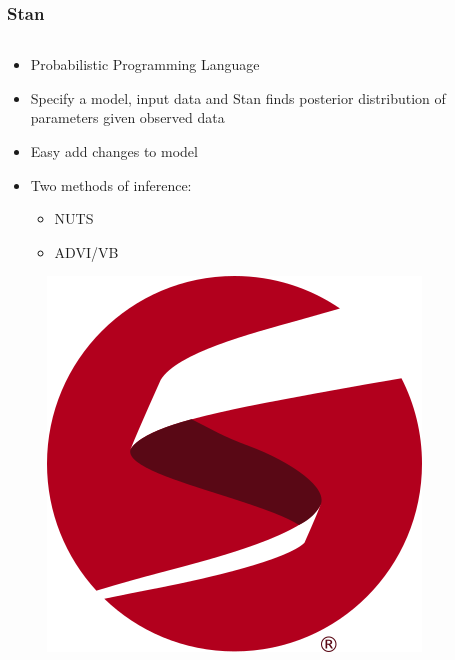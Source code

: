 \documentclass{beamer}
\begin{document}
\begin{frame}
\frametitle{Stan}
    \begin{columns}
\begin{column}{0.5\textwidth}

    \begin{itemize}
    \item Probabilistic Programming Language
    \item Specify a model, input data and Stan finds posterior distribution of parameters given observed data
    \item Easy add changes to model
    \item Two methods of inference:
    \begin{itemize}
        \item NUTS
        \item ADVI/VB
    \end{itemize}
\end{itemize}

\begin{figure}
    \centering
    \includegraphics[width=.2\linewidth]{stan_logo.png}
\end{figure}


\end{column}
\end{columns}
\end{frame}
\end{document}
